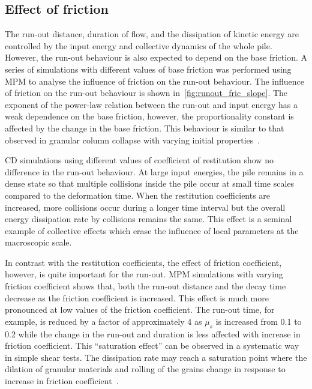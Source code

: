 \subsection{Effect of friction}
\label{sec:parameters}

The run-out distance, duration of flow, and the dissipation of kinetic energy 
are controlled by the input energy and collective dynamics of the whole pile. 
However, the run-out behaviour is also expected to depend on the base friction. 
A series of simulations with different values of base friction was performed 
using MPM to analyse the influence of friction on the run-out behaviour. The 
influence of friction on the run-out behaviour is shown 
in~\cref{fig:runout_fric_slope}. The exponent of the 
power-law relation between the run-out and input energy has a weak dependence 
on the base friction, however, the proportionality constant is affected by the 
change in the base friction. This behaviour is similar to that observed in 
granular column collapse with varying initial 
properties~\citep{Balmforth2005,Lajeunesse2005}. 

CD simulations using different values of coefficient of restitution show no 
difference in the run-out behaviour. At large input energies, the pile remains 
in a dense state so that multiple collisions inside the pile occur at small 
time scales compared to the deformation time. When the restitution coefficients 
are increased, more collisions occur during a longer time interval but the 
overall energy dissipation rate by collisions remains the same. This effect is 
a seminal example of collective effects which erase the influence of local 
parameters at the macroscopic scale.

In contrast with the restitution coefficients, the effect of friction 
coefficient, however, is quite important for the run-out. MPM simulations with 
varying friction coefficient shows that, both the run-out distance and the 
decay time decrease as the friction coefficient is increased. This 
effect is much more pronounced at low values of the friction coefficient. 
The run-out time, for example, is reduced by a factor of approximately 4 as 
$\mu_s$ is increased from 0.1 to 0.2 while the change in the run-out and 
duration is 
less affected with increase in friction coefficient. This ``saturation effect'' 
can be observed in a systematic way in simple shear tests. The dissipation rate 
may reach a saturation point where the dilation of granular materials and 
rolling of the grains change in response to increase in friction 
coefficient~\citep{Estrada2008}.

